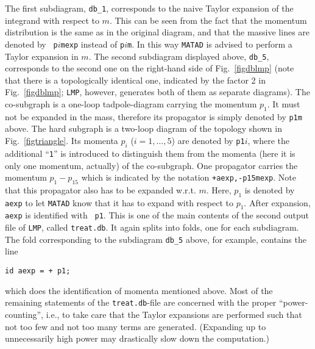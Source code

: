 The first subdiagram, {\tt db\_1}, corresponds to the naive
Taylor expansion of the integrand with respect to $m$. This can be seen
from the fact that the momentum distribution is the same as in the
original diagram, and that the massive lines are denoted by {\tt
  p}$i${\tt mexp} instead of {\tt p}$i${\tt m}. In this way {\tt MATAD}
is advised to perform a Taylor expansion in $m$.  The second subdiagram
displayed above, {\tt db\_5}, corresponds to the second one on the
right-hand side of Fig.~\ref{figdblmp} (note that there is a
topologically identical one, indicated by the factor 2 in
Fig.~\ref{figdblmp}; {\tt LMP}, however, generates both of them as
separate diagrams).  The co-subgraph is a one-loop tadpole-diagram
carrying the momentum $p_1$. It must not be expanded in the mass,
therefore its propagator is simply denoted by {\tt p1m} above. The hard
subgraph is a two-loop diagram of the topology shown in
Fig.~\ref{figtriangle}.  Its momenta $p_i$ ($i=1,\ldots,5$) are denoted
by {\tt p1}$i$, where the additional ``{\tt 1}'' is introduced to
distinguish them from the momenta (here it is only one momentum,
actually) of the co-subgraph. One propagator carries the momentum $p_1 -
p_{15}$ which is indicated by the notation {\tt +aexp,-p15mexp}. Note
that this propagator also has to be expanded w.r.t. $m$. Here, $p_1$ is
denoted by {\tt aexp} to let {\tt MATAD} know that it has to expand with
respect to $p_1$. After expansion, {\tt aexp} is identified with {\tt
  p1}. This is one of the main contents of the second output file of
{\tt LMP}, called {\tt treat.db}. It again splits into folds, one for
each subdiagram.  The fold corresponding to the subdiagram {\tt db\_5}
above, for example, contains the line
\begin{verbatim}
id aexp = + p1;
\end{verbatim}
which does the identification of momenta mentioned above.  Most of the
remaining statements of the {\tt treat.db}-file are concerned with the
proper ``power-counting'', i.e., to take care that the Taylor expansions
are performed such that not too few and not too many terms are
generated.  (Expanding up to unnecessarily high power may drastically
slow down the computation.)  

